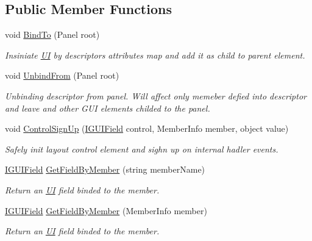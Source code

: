 \subsection*{Public Member Functions}
\begin{DoxyCompactItemize}
\item 
void \mbox{\hyperlink{class_wpf_handler_1_1_u_i_1_1_auto_layout_1_1_u_i_descriptor_af342f6e3f3a3fc86eed3e998bbce1cc5}{Bind\+To}} (Panel root)
\begin{DoxyCompactList}\small\item\em Insiniate \mbox{\hyperlink{namespace_wpf_handler_1_1_u_i}{UI}} by descriptor\textquotesingle{}s attributes map and add it as child to parent element. \end{DoxyCompactList}\item 
void \mbox{\hyperlink{class_wpf_handler_1_1_u_i_1_1_auto_layout_1_1_u_i_descriptor_aa2a2328a6283c4df8aad0b8f925922e8}{Unbind\+From}} (Panel root)
\begin{DoxyCompactList}\small\item\em Unbinding descriptor from panel. Will affect only memeber defied into descriptor and leave and other G\+UI elements childed to the panel. \end{DoxyCompactList}\item 
void \mbox{\hyperlink{class_wpf_handler_1_1_u_i_1_1_auto_layout_1_1_u_i_descriptor_a2862ba93b12a9698b88795d41c672f97}{Control\+Sign\+Up}} (\mbox{\hyperlink{interface_wpf_handler_1_1_u_i_1_1_auto_layout_1_1_i_g_u_i_field}{I\+G\+U\+I\+Field}} control, Member\+Info member, object value)
\begin{DoxyCompactList}\small\item\em Safely init layout control element and sighn up on internal hadler events. \end{DoxyCompactList}\item 
\mbox{\hyperlink{interface_wpf_handler_1_1_u_i_1_1_auto_layout_1_1_i_g_u_i_field}{I\+G\+U\+I\+Field}} \mbox{\hyperlink{class_wpf_handler_1_1_u_i_1_1_auto_layout_1_1_u_i_descriptor_af39e8fdd24e6de1956b0e3b60fa74368}{Get\+Field\+By\+Member}} (string member\+Name)
\begin{DoxyCompactList}\small\item\em Return an \mbox{\hyperlink{namespace_wpf_handler_1_1_u_i}{UI}} field binded to the member. \end{DoxyCompactList}\item 
\mbox{\hyperlink{interface_wpf_handler_1_1_u_i_1_1_auto_layout_1_1_i_g_u_i_field}{I\+G\+U\+I\+Field}} \mbox{\hyperlink{class_wpf_handler_1_1_u_i_1_1_auto_layout_1_1_u_i_descriptor_ab965d93a86ca10bb9e7b30ac14fcfad8}{Get\+Field\+By\+Member}} (Member\+Info member)
\begin{DoxyCompactList}\small\item\em Return an \mbox{\hyperlink{namespace_wpf_handler_1_1_u_i}{UI}} field binded to the member. \end{DoxyCompactList}\end{DoxyCompactItemize}
